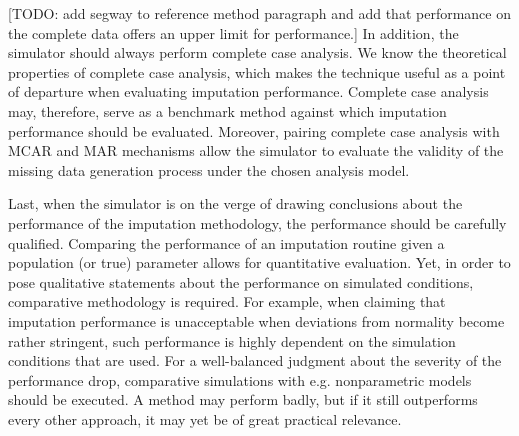 \documentclass[bimj,fleqn]{w-art}
\begin{document}
[TODO: add segway to reference method paragraph and add that performance on the complete data offers an upper limit for performance.] In addition, the simulator should always perform complete case analysis. We know the theoretical properties of complete case analysis, which makes the technique useful as a point of departure when evaluating imputation performance. Complete case analysis may, therefore, serve as a benchmark method against which imputation performance should be evaluated. Moreover, pairing complete case analysis with MCAR and MAR mechanisms allow the simulator to evaluate the validity of the missing data generation process under the chosen analysis model.











Last, when the simulator is on the verge of drawing conclusions about the performance of the imputation methodology, the performance should be carefully qualified. Comparing the performance of an imputation routine given a population (or true) parameter allows for quantitative evaluation. Yet, in order to pose qualitative statements about the performance on simulated conditions, comparative methodology is required. For example, when claiming that imputation performance is unacceptable when deviations from normality become rather stringent, such performance is highly dependent on the simulation conditions that are used. For a well-balanced judgment about the severity of the performance drop, comparative simulations with e.g. nonparametric models should be executed. A method may perform badly, but if it still outperforms every other approach, it may yet be of great practical relevance.

\end{document}
